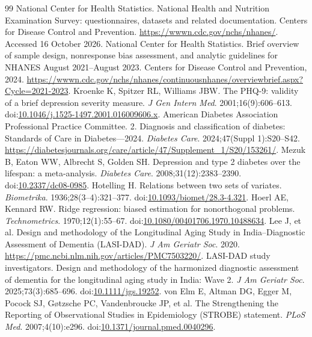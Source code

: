 \documentclass[11pt,a4paper]{article}
\begin{document}
\begin{thebibliography}{99}\small
{} National Center for Health Statistics. National Health and Nutrition Examination Survey: questionnaires, datasets and related documentation. Centers for Disease Control and Prevention. \url{https://wwwn.cdc.gov/nchs/nhanes/}. Accessed 16 October 2026.
 National Center for Health Statistics. Brief overview of sample design, nonresponse bias assessment, and analytic guidelines for NHANES August 2021--August 2023. Centers for Disease Control and Prevention, 2024. \url{https://wwwn.cdc.gov/nchs/nhanes/continuousnhanes/overviewbrief.aspx?Cycle=2021-2023}.
 Kroenke K, Spitzer RL, Williams JBW. The PHQ-9: validity of a brief depression severity measure. \emph{J Gen Intern Med}. 2001;16(9):606--613. doi:\href{https://doi.org/10.1046/j.1525-1497.2001.016009606.x}{10.1046/j.1525-1497.2001.016009606.x}.
 American Diabetes Association Professional Practice Committee. 2. Diagnosis and classification of diabetes: Standards of Care in Diabetes---2024. \emph{Diabetes Care}. 2024;47(Suppl 1):S20--S42. \url{https://diabetesjournals.org/care/article/47/Supplement_1/S20/153261/}.
 Mezuk B, Eaton WW, Albrecht S, Golden SH. Depression and type 2 diabetes over the lifespan: a meta-analysis. \emph{Diabetes Care}. 2008;31(12):2383--2390. doi:\href{https://doi.org/10.2337/dc08-0985}{10.2337/dc08-0985}.
 Hotelling H. Relations between two sets of variates. \emph{Biometrika}. 1936;28(3--4):321--377. doi:\href{https://doi.org/10.1093/biomet/28.3-4.321}{10.1093/biomet/28.3-4.321}.
 Hoerl AE, Kennard RW. Ridge regression: biased estimation for nonorthogonal problems. \emph{Technometrics}. 1970;12(1):55--67. doi:\href{https://doi.org/10.1080/00401706.1970.10488634}{10.1080/00401706.1970.10488634}.
 Lee J, et al. Design and methodology of the Longitudinal Aging Study in India--Diagnostic Assessment of Dementia (LASI-DAD). \emph{J Am Geriatr Soc}. 2020. \url{https://pmc.ncbi.nlm.nih.gov/articles/PMC7503220/}.
 LASI-DAD study investigators. Design and methodology of the harmonized diagnostic assessment of dementia for the longitudinal aging study in India: Wave 2. \emph{J Am Geriatr Soc}. 2025;73(3):685--696. doi:\href{https://doi.org/10.1111/jgs.19252}{10.1111/jgs.19252}.
 von Elm E, Altman DG, Egger M, Pocock SJ, G\o tzsche PC, Vandenbroucke JP, et al. The Strengthening the Reporting of Observational Studies in Epidemiology (STROBE) statement. \emph{PLoS Med}. 2007;4(10):e296. doi:\href{https://doi.org/10.1371/journal.pmed.0040296}{10.1371/journal.pmed.0040296}.
\end{thebibliography}
\end{document}
